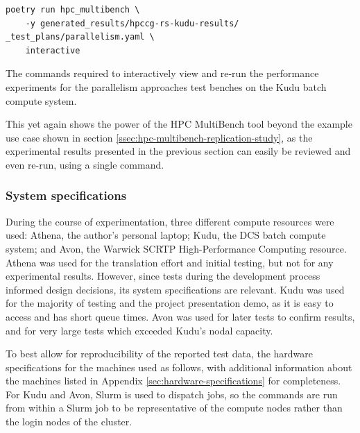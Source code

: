 \begin{code}
    \begin{verbatim}
poetry run hpc_multibench \
    -y generated_results/hpccg-rs-kudu-results/ _test_plans/parallelism.yaml \
    interactive
    \end{verbatim}
    \caption{The commands required to interactively view and re-run the performance experiments for the parallelism approaches test benches on the Kudu batch compute system.}
    \label{listing:serial-data-interactive}
\end{code}

This yet again shows the power of the HPC MultiBench tool beyond the example use case shown in section \ref{ssec:hpc-multibench-replication-study}, as the experimental results presented in the previous section can easily be reviewed and even re-run, using a single command.


\subsubsection{System specifications}
\label{sssec:system-specifications}

During the course of experimentation, three different compute resources were used: Athena, the author's personal laptop; Kudu, the DCS batch compute system; and Avon, the Warwick SCRTP High-Performance Computing resource. Athena was used for the translation effort and initial testing, but not for any experimental results. However, since tests during the development process informed design decisions, its system specifications are relevant. Kudu was used for the majority of testing and the project presentation demo, as it is easy to access and has short queue times. Avon was used for later tests to confirm results, and for very large tests which exceeded Kudu's nodal capacity.

To best allow for reproducibility of the reported test data, the hardware specifications for the machines used as follows, with additional information about the machines listed in Appendix \ref{sec:hardware-specifications} for completeness. For Kudu and Avon, Slurm is used to dispatch jobs, so the commands are run from within a Slurm job to be representative of the compute nodes rather than the login nodes of the cluster.

